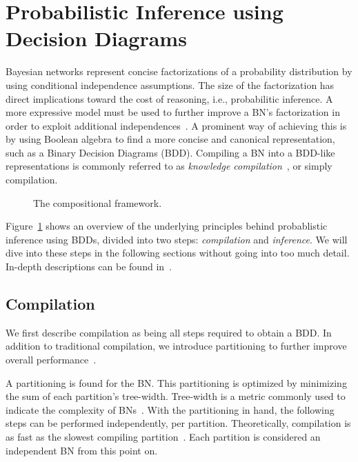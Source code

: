
\section{Probabilistic Inference using Decision Diagrams}\label{sec:parallel}


Bayesian networks represent concise factorizations of a probability distribution by using conditional independence assumptions. The size of the factorization has direct implications toward the cost of reasoning, i.e., probabilitic inference. A more expressive model must be used to further improve a BN's factorization in order to exploit additional independences~\cite{boutilier1996context,friedman1998learning,zhang1996exploiting}. A prominent way of achieving this is by using Boolean algebra to find a more concise and canonical representation, such as a Binary Decision Diagrams (BDD). Compiling a BN into a BDD-like representations is commonly referred to as \emph{knowledge compilation}~\cite{darwiche2002knowledge}, or simply compilation.

\begin{figure}[!t]
    \centering
    \scalebox{0.9}{
        
    }
    \caption{The compositional framework.}
    \label{fig:frameworkoverview}
\end{figure}


Figure~\ref{fig:frameworkoverview} shows an overview of the underlying principles behind probablistic inference using BDDs, divided into two steps: \emph{compilation} and \emph{inference}. We will dive into these steps in the following sections without going into too much detail. In-depth descriptions can be found in~\cite{dal2021compositional}.

\subsection{Compilation}

We first describe compilation as being all steps required to obtain a BDD. In addition to traditional compilation, we introduce partitioning to further improve overall performance~\cite{dal2017reducing}.

A partitioning is found for the BN. This partitioning is optimized by minimizing the sum of each partition's tree-width. Tree-width is a metric commonly used to indicate the complexity of BNs~\cite{bollig2014width}. With the partitioning in hand, the following steps can be performed independently, per partition. Theoretically, compilation is as fast as the slowest compiling partition~\cite{dal2018parallel}. Each partition is considered an independent BN from this point on.

